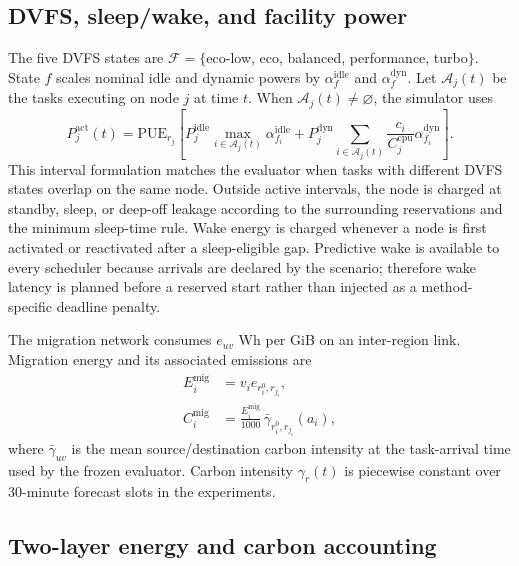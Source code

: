 \documentclass[preprint,12pt]{elsarticle}
\begin{document}
\subsection{DVFS, sleep/wake, and facility power}

The five DVFS states are $\mathcal{F}=\{$eco-low, eco, balanced, performance, turbo$\}$. State $f$ scales nominal idle and dynamic powers by $\alpha_f^{\mathrm{idle}}$ and $\alpha_f^{\mathrm{dyn}}$. Let $\mathcal{A}_j(t)$ be the tasks executing on node $j$ at time $t$. When $\mathcal{A}_j(t)\neq\varnothing$, the simulator uses
\begin{equation}
P_j^{\mathrm{act}}(t)=\mathrm{PUE}_{r_j}\!\left[
P_j^{\mathrm{idle}}\max_{i\in\mathcal{A}_j(t)}\alpha_{f_i}^{\mathrm{idle}}
+P_j^{\mathrm{dyn}}\sum_{i\in\mathcal{A}_j(t)}
\frac{c_i}{C_j^{\mathrm{cpu}}}\alpha_{f_i}^{\mathrm{dyn}}
\right].
\label{eq:active-power}
\end{equation}
This interval formulation matches the evaluator when tasks with different DVFS states overlap on the same node. Outside active intervals, the node is charged at standby, sleep, or deep-off leakage according to the surrounding reservations and the minimum sleep-time rule. Wake energy is charged whenever a node is first activated or reactivated after a sleep-eligible gap. Predictive wake is available to every scheduler because arrivals are declared by the scenario; therefore wake latency is planned before a reserved start rather than injected as a method-specific deadline penalty.

The migration network consumes $e_{uv}$ Wh per GiB on an inter-region link. Migration energy and its associated emissions are
\begin{align}
E_i^{\mathrm{mig}} &= v_i e_{r_i^0,r_{j_i}}, \\
C_i^{\mathrm{mig}} &= \frac{E_i^{\mathrm{mig}}}{1000}\,\bar{\gamma}_{r_i^0,r_{j_i}}(a_i),
\label{eq:migration-energy}
\end{align}
where $\bar{\gamma}_{uv}$ is the mean source/destination carbon intensity at the task-arrival time used by the frozen evaluator. Carbon intensity $\gamma_r(t)$ is piecewise constant over 30-minute forecast slots in the experiments.

\subsection{Two-layer energy and carbon accounting}
\label{sec:two-layer}
\end{document}
